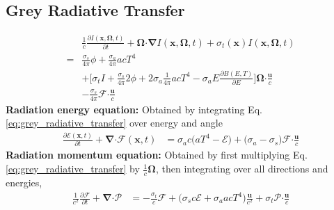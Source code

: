 \documentclass[10pt,letterpaper,notitlepage]{article}
\numberwithin{equation}{section}
\newcommand{\partialderiv}[2]{\frac{\partial #1}{\partial #2}}
\newcommand{\Omegabf}{\mathbf{\Omega}}
\newcommand{\bnabla}{\boldsymbol{\nabla}}
\newcommand{\position}{\mathbf{x}}
\newcommand{\dotp}{\boldsymbol{\cdot}}
\newcommand{\RadE}{\mathcal{E}}
\newcommand{\RadF}{\boldsymbol{\mathcal{F}}}
\newcommand{\RadP}{\boldsymbol{\mathcal{P}}}
\newcommand{\beqn}{\begin{equation}\begin{aligned}}
\newcommand{\eeqn}{\end{aligned}\end{equation}}
\begin{document}
\subsection{Grey Radiative Transfer}
\beqn \label{eq:grey_radiative_transfer}
&\frac{1}{c} \frac{\partial I(\position, \Omegabf, t)}{\partial t} 
+\Omegabf \dotp \bnabla I(\position, \Omegabf, t)
+\sigma_t(\position) I(\position, \Omegabf, t) \\
=& \frac{\sigma_s}{4\pi} \phi
+ \frac{\sigma_a}{4\pi} a c T^4\\
&+
\biggr[
\sigma_t  I
+\frac{\sigma_s}{4\pi} 2\phi 
+2\sigma_a \frac{1}{4\pi} acT^4
-\sigma_a E \frac{\partial B(E,T)}{\partial E}
\biggr] \Omegabf \dotp \frac{\mathbf{u}}{c} \\
&-\frac{\sigma_s}{4\pi}  \RadF \dotp \frac{\mathbf{u}}{c}
\eeqn 
\textbf{Radiation energy equation:}\newline 
Obtained by integrating Eq. \eqref{eq:grey_radiative_transfer} over energy and angle
\beqn \label{eq:radiation_energy_equation}
\frac{\partial \RadE(\position, t)}{\partial t} 
+\bnabla \dotp \RadF(\position, t) &=  \sigma_a c \bigr( aT^4 - \RadE \bigr)
+ \bigr( \sigma_a  - \sigma_s\bigr)
\RadF \dotp  \frac{\mathbf{u}}{c}
\eeqn 
\newline
\newline 
\textbf{Radiation momentum equation:}\newline
Obtained by first multiplying Eq. \eqref{eq:grey_radiative_transfer} by $\frac{1}{c} \Omegabf$, then integrating over all directions and energies,
\beqn \label{eq:radiation_momentum_equation}
\frac{1}{c^2} \partialderiv{\RadF}{t} + \bnabla \dotp \RadP &= - \frac{\sigma_t}{c} \RadF  
+ \bigr( \sigma_s c\RadE + \sigma_a acT^4 \bigr) \frac{\mathbf{u}}{c^2} 
+\sigma_t \RadP \dotp \frac{\mathbf{u}}{c}
\eeqn 
\end{document}
